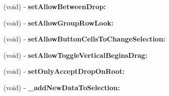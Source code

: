 \begin{DoxyCompactItemize}
\item 
\hypertarget{interface_tree_controller_a1373de595f1a6c11c992436e0a80f5b0}{
(void) -\/ {\bfseries setAllowBetweenDrop:}}
\label{interface_tree_controller_a1373de595f1a6c11c992436e0a80f5b0}

\item 
\hypertarget{interface_tree_controller_a45ccaa0eb9cfc3f435b26ae69a7450c7}{
(void) -\/ {\bfseries setAllowGroupRowLook:}}
\label{interface_tree_controller_a45ccaa0eb9cfc3f435b26ae69a7450c7}

\item 
\hypertarget{interface_tree_controller_a3d03663cc4ac9b7ce014634481dbb4c1}{
(void) -\/ {\bfseries setAllowButtonCellsToChangeSelection:}}
\label{interface_tree_controller_a3d03663cc4ac9b7ce014634481dbb4c1}

\item 
\hypertarget{interface_tree_controller_af6cc0e2ea11e52963736fffadfe4c346}{
(void) -\/ {\bfseries setAllowToggleVerticalBeginsDrag:}}
\label{interface_tree_controller_af6cc0e2ea11e52963736fffadfe4c346}

\item 
\hypertarget{interface_tree_controller_a2fe761a985849bb3a5ca114fd5ef670d}{
(void) -\/ {\bfseries setOnlyAcceptDropOnRoot:}}
\label{interface_tree_controller_a2fe761a985849bb3a5ca114fd5ef670d}

\item 
\hypertarget{interface_tree_controller_a1818a72a6e6b7bd3c1823f0a7d3d4607}{
(void) -\/ {\bfseries \_\-addNewDataToSelection:}}
\label{interface_tree_controller_a1818a72a6e6b7bd3c1823f0a7d3d4607}

\end{DoxyCompactItemize}
